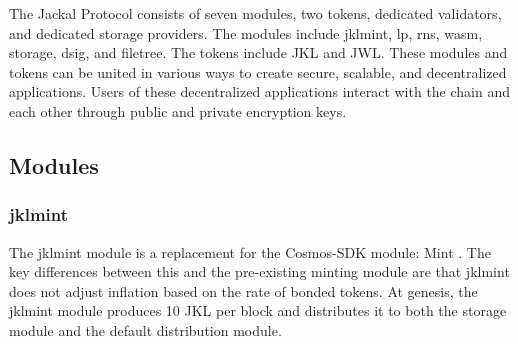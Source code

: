\documentclass[a4paper]{article}
\begin{document}
\begin{figure}[!htbp]
\centering
{}
\end{figure}
The Jackal Protocol consists of seven modules, two tokens, dedicated validators, and dedicated storage providers. The modules include jklmint, lp, rns, wasm, storage, dsig, and filetree. The tokens include JKL and JWL.  These modules and tokens can be united in various ways to create secure, scalable, and decentralized applications. Users of these decentralized applications interact with the chain and each other through public and private encryption keys.

\newpage
\subsection{Modules}
\subsubsection{jklmint}
The jklmint module is a replacement for the Cosmos-SDK module: Mint \cite{mint}. The key differences between this and the pre-existing minting module are that jklmint does not adjust inflation based on the rate of bonded tokens. At genesis, the jklmint module produces 10 JKL per block and distributes it to both the storage module and the default distribution module.
\end{document}
